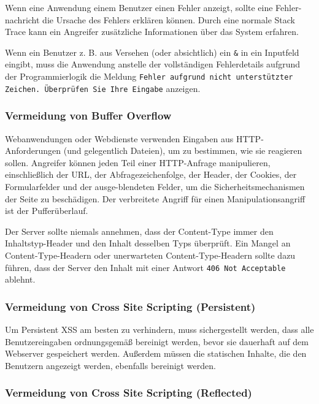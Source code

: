 Wenn eine Anwendung einem Benutzer einen Fehler anzeigt, sollte eine Fehler-nachricht die Ursache des Fehlers erklären können. Durch eine normale Stack Trace kann ein Angreifer zusätzliche Informationen über das System erfahren.

Wenn ein Benutzer z. B. aus Versehen (oder absichtlich) ein \texttt{\&} in ein Inputfeld eingibt, muss die Anwendung anstelle der vollständigen Fehlerdetails aufgrund der Programmierlogik die Meldung \texttt{Fehler aufgrund nicht unterstützter Zeichen. Überprüfen Sie Ihre Eingabe} anzeigen\cite{ase17}.

\subsubsection{Vermeidung von Buffer Overflow}

Webanwendungen oder Webdienste verwenden Eingaben aus HTTP-Anforderungen (und gelegentlich Dateien), um zu bestimmen, wie sie reagieren sollen. Angreifer können jeden Teil einer HTTP-Anfrage manipulieren, einschließlich der URL, der Abfragezeichenfolge, der Header, der Cookies, der Formularfelder und der ausge-blendeten Felder, um die Sicherheitsmechanismen der Seite zu beschädigen. Der verbreitete Angriff für einen Manipulationsangriff ist der Pufferüberlauf.

Der Server sollte niemals annehmen, dass der Content-Type immer den Inhaltstyp-Header und den Inhalt desselben Typs überprüft. Ein Mangel an Content-Type-Headern oder unerwarteten Content-Type-Headern sollte dazu führen, dass der
Server den Inhalt mit einer Antwort \texttt{406 Not Acceptable} ablehnt\cite{bofangpre16}.

\subsubsection{Vermeidung von Cross Site Scripting (Persistent)}

Um Persistent XSS am besten zu verhindern, muss sichergestellt werden, dass alle Benutzereingaben ordnungsgemäß bereinigt werden, bevor sie dauerhaft auf dem Webserver gespeichert werden. Außerdem müssen die statischen Inhalte, die den Benutzern angezeigt werden, ebenfalls bereinigt werden\cite{xsspersistent14}.

\subsubsection{Vermeidung von Cross Site Scripting (Reflected)}

